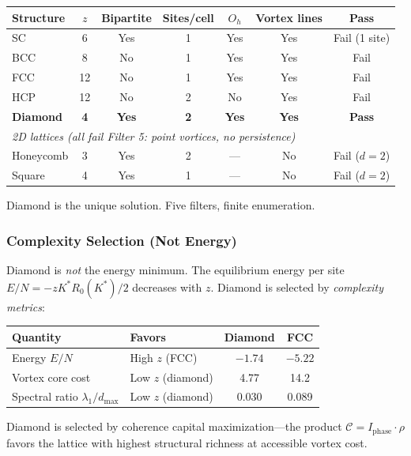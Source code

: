 \documentclass[aps,prd,onecolumn,superscriptaddress,floatfix,12pt]{revtex4-2}
\newcommand{\Rzero}{R_0}
\newcommand{\Iphase}{I_{\text{phase}}}
\begin{document}
\begin{table}[h]
\begin{tabular}{lcccccc}
\toprule
Structure & $z$ & Bipartite & Sites/cell & $O_h$ & Vortex lines & Pass \\
\midrule
SC & 6 & Yes & 1 & Yes & Yes & Fail (1 site) \\
BCC & 8 & No & 1 & Yes & Yes & Fail \\
FCC & 12 & No & 1 & Yes & Yes & Fail \\
HCP & 12 & No & 2 & No & Yes & Fail \\
\textbf{Diamond} & \textbf{4} & \textbf{Yes} & \textbf{2} & \textbf{Yes} & \textbf{Yes} & \textbf{Pass} \\
\midrule
\multicolumn{7}{l}{\emph{2D lattices (all fail Filter 5: point vortices, no persistence)}} \\
Honeycomb & 3 & Yes & 2 & --- & No & Fail ($d{=}2$) \\
Square & 4 & Yes & 1 & --- & No & Fail ($d{=}2$) \\
\bottomrule
\end{tabular}
\end{table}

Diamond is the unique solution. Five filters, finite enumeration.

\subsubsection{Complexity Selection (Not Energy)}

Diamond is \emph{not} the energy minimum. The equilibrium energy per site $E/N = -z K^* \Rzero(K^*)/2$ decreases with $z$. Diamond is selected by \emph{complexity metrics}:

\begin{table}[h]
\begin{tabular}{llcc}
\toprule
Quantity & Favors & Diamond & FCC \\
\midrule
Energy $E/N$ & High $z$ (FCC) & $-1.74$ & $-5.22$ \\
Vortex core cost & Low $z$ (diamond) & 4.77 & 14.2 \\
Spectral ratio $\lambda_1/d_{\max}$ & Low $z$ (diamond) & 0.030 & 0.089 \\
\bottomrule
\end{tabular}
\end{table}

Diamond is selected by coherence capital maximization---the product $\mathcal{C} = \Iphase \cdot \rho$ favors the lattice with highest structural richness at accessible vortex cost.
\end{document}
